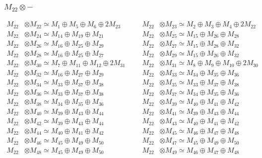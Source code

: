 \subsubsection{$ M_{22}\otimes -$}
\begin{align*}
M_{22} &\otimes M_{22} \simeq M_{1} \oplus M_{5} \oplus M_{6} \oplus 2M_{23} &&& M_{22} &\otimes M_{23} \simeq M_{2} \oplus M_{3} \oplus M_{4} \oplus 2M_{22}\\
M_{22} &\otimes M_{24} \simeq M_{14} \oplus M_{19} \oplus M_{21} &&& M_{22} &\otimes M_{25} \simeq M_{15} \oplus M_{26} \oplus M_{28}\\
M_{22} &\otimes M_{26} \simeq M_{16} \oplus M_{25} \oplus M_{29} &&& M_{22} &\otimes M_{27} \simeq M_{15} \oplus M_{28} \oplus M_{32}\\
M_{22} &\otimes M_{28} \simeq M_{16} \oplus M_{25} \oplus M_{27} &&& M_{22} &\otimes M_{29} \simeq M_{15} \oplus M_{26} \oplus M_{32}\\
M_{22} &\otimes M_{30} \simeq M_{7} \oplus M_{11} \oplus M_{12} \oplus 2M_{31} &&& M_{22} &\otimes M_{31} \simeq M_{8} \oplus M_{9} \oplus M_{10} \oplus 2M_{30}\\
M_{22} &\otimes M_{32} \simeq M_{16} \oplus M_{27} \oplus M_{29} &&& M_{22} &\otimes M_{33} \simeq M_{34} \oplus M_{35} \oplus M_{36}\\
M_{22} &\otimes M_{34} \simeq M_{33} \oplus M_{37} \oplus M_{38} &&& M_{22} &\otimes M_{35} \simeq M_{33} \oplus M_{37} \oplus M_{38}\\
M_{22} &\otimes M_{36} \simeq M_{33} \oplus M_{37} \oplus M_{38} &&& M_{22} &\otimes M_{37} \simeq M_{34} \oplus M_{35} \oplus M_{36}\\
M_{22} &\otimes M_{38} \simeq M_{34} \oplus M_{35} \oplus M_{36} &&& M_{22} &\otimes M_{39} \simeq M_{40} \oplus M_{41} \oplus M_{42}\\
M_{22} &\otimes M_{40} \simeq M_{39} \oplus M_{43} \oplus M_{44} &&& M_{22} &\otimes M_{41} \simeq M_{39} \oplus M_{43} \oplus M_{44}\\
M_{22} &\otimes M_{42} \simeq M_{39} \oplus M_{43} \oplus M_{44} &&& M_{22} &\otimes M_{43} \simeq M_{40} \oplus M_{41} \oplus M_{42}\\
M_{22} &\otimes M_{44} \simeq M_{40} \oplus M_{41} \oplus M_{42} &&& M_{22} &\otimes M_{45} \simeq M_{46} \oplus M_{47} \oplus M_{48}\\
M_{22} &\otimes M_{46} \simeq M_{45} \oplus M_{49} \oplus M_{50} &&& M_{22} &\otimes M_{47} \simeq M_{45} \oplus M_{49} \oplus M_{50}\\
M_{22} &\otimes M_{48} \simeq M_{45} \oplus M_{49} \oplus M_{50} &&& M_{22} &\otimes M_{49} \simeq M_{46} \oplus M_{47} \oplus M_{48}\\

\end{align*}
